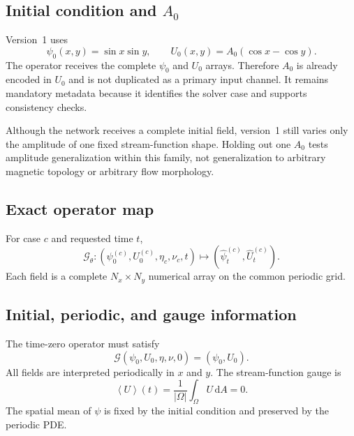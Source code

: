 \documentclass[11pt]{article}
\newcommand{\dd}{\mathrm{d}}
\newcommand{\average}[1]{\left\langle #1\right\rangle}
\begin{document}
\subsection{Initial condition and $A_0$}
Version~1 uses
\begin{equation}
\psi_0(x,y)=\sin x\sin y,
\qquad
U_0(x,y)=A_0(\cos x-\cos y).
\end{equation}
The operator receives the complete $\psi_0$ and $U_0$ arrays. Therefore $A_0$ is already encoded in $U_0$ and is not duplicated as a primary input channel. It remains mandatory metadata because it identifies the solver case and supports consistency checks.

\begin{warningbox}
Although the network receives a complete initial field, version~1 still varies only the amplitude of one fixed stream-function shape. Holding out one $A_0$ tests amplitude generalization within this family, not generalization to arbitrary magnetic topology or arbitrary flow morphology.
\end{warningbox}

\subsection{Exact operator map}
For case $c$ and requested time $t$,
\begin{equation}
\boxed{
\mathcal{G}_\theta:
\left(\psi_0^{(c)},U_0^{(c)},\eta_c,\nu_c,t\right)
\longmapsto
\left(\widehat\psi^{(c)}_t,\widehat U^{(c)}_t\right).
}
\label{eq:operator}
\end{equation}
Each field is a complete $N_x\times N_y$ numerical array on the common periodic grid.

\subsection{Initial, periodic, and gauge information}
The time-zero operator must satisfy
\begin{equation}
\mathcal{G}(\psi_0,U_0,\eta,\nu,0)=(\psi_0,U_0).
\label{eq:icidentity}
\end{equation}
All fields are interpreted periodically in $x$ and $y$. The stream-function gauge is
\begin{equation}
\average U(t)=\frac{1}{|\Omega|}\int_\Omega U\,\dd A=0.
\end{equation}
The spatial mean of $\psi$ is fixed by the initial condition and preserved by the periodic PDE.
\end{document}
